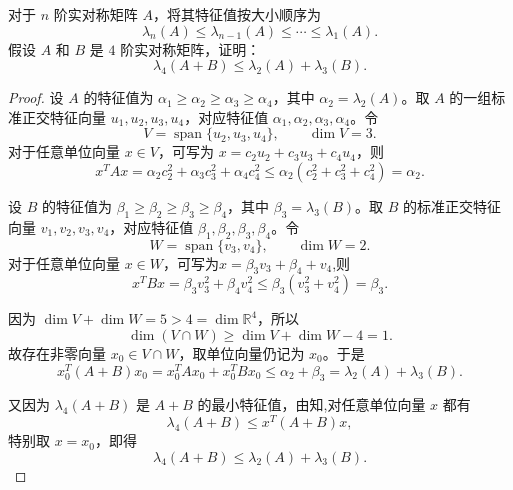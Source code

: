 \documentclass[../../main.tex]{subfiles}%
\begin{document}
\begin{example}
对于 \(n\) 阶实对称矩阵 \(A\)，将其特征值按大小顺序为
\[
\lambda_n(A) \leqslant \lambda_{n-1}(A) \leqslant \cdots \leqslant \lambda_1(A).
\]
假设 \(A\) 和 \(B\) 是 \(4\) 阶实对称矩阵，证明：
\[
\lambda_4(A+B) \leqslant \lambda_2(A) + \lambda_3(B).
\]
\end{example}
\begin{proof}
设 \(A\) 的特征值为 \(\alpha_1\geqslant \alpha_2\geqslant \alpha_3\geqslant \alpha_4\)，其中 \(\alpha_2=\lambda_2(A)\)。取 \(A\) 的一组标准正交特征向量 \(u_1,u_2,u_3,u_4\)，对应特征值 \(\alpha_1,\alpha_2,\alpha_3,\alpha_4\)。令
\[
V=\operatorname{span}\{u_2,u_3,u_4\},\qquad \dim V=3.
\]
对于任意单位向量 \(x\in V\)，可写为 \(x=c_2u_2+c_3u_3+c_4u_4\)，则
\[
x^T A x=\alpha_2 c_2^2+\alpha_3 c_3^2+\alpha_4 c_4^2
\leqslant \alpha_2(c_2^2+c_3^2+c_4^2)=\alpha_2.
\]

设 \(B\) 的特征值为 \(\beta_1\geqslant \beta_2\geqslant \beta_3\geqslant \beta_4\)，其中 \(\beta_3=\lambda_3(B)\)。取 \(B\) 的标准正交特征向量 \(v_1,v_2,v_3,v_4\)，对应特征值 \(\beta_1,\beta_2,\beta_3,\beta_4\)。令
\[
W=\operatorname{span}\{v_3,v_4\},\qquad \dim W=2.
\]
对于任意单位向量 \(x\in W\)，可写为$x=\beta_3v_3+\beta_4+v_4$,则
\[
x^TBx=\beta _3v_{3}^{2}+\beta _4v_{4}^{2}\leqslant \beta _3\left( v_{3}^{2}+v_{4}^{2} \right) =\beta _3.
\]

因为 \(\dim V+\dim W=5>4=\dim \mathbb R^4\)，所以
\[
\dim(V\cap W)\geqslant \dim V+\dim W-4=1.
\]
故存在非零向量 \(x_0\in V\cap W\)，取单位向量仍记为 \(x_0\)。于是
\[
x_0^T(A+B)x_0=x_0^T A x_0+x_0^T B x_0\leqslant \alpha_2+\beta_3=\lambda_2(A)+\lambda_3(B).
\]

又因为 \(\lambda_4(A+B)\) 是 \(A+B\) 的最小特征值，由知,对任意单位向量 \(x\) 都有
\[
\lambda_4(A+B)\leqslant x^T(A+B)x,
\]
特别取 \(x=x_0\)，即得
\[
\lambda_4(A+B)\leqslant \lambda_2(A)+\lambda_3(B).
\]\end{proof}
\end{document}
